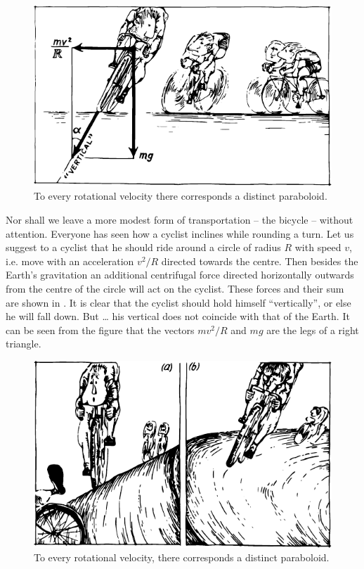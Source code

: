 \begin{figure}[!ht]
\centering
\includegraphics[width=\textwidth]{figures/fig-02-09.pdf}
\caption{To every rotational velocity there corresponds a distinct paraboloid.}
\label{fig-2.09}
\end{figure}

Nor shall we leave a more modest form of transportation -- the bicycle -- without attention. Everyone has seen
how a cyclist inclines while rounding a turn. Let us
suggest to a cyclist that he should ride around a circle
of radius $R$ with speed $v$, i.e. move with an acceleration $v^{2} / R$ directed towards the centre. Then besides the Earth's
gravitation an additional centrifugal force directed
horizontally outwards from the centre of the circle will
act on the cyclist. These forces and their sum are shown
in . It is clear that the cyclist should hold himself ``vertically'', or else he will fall down. But \ldots{} his
vertical does not coincide with that of the Earth. It
can be seen from the figure that the vectors $mv^{2}/R$ and
$mg$ are the legs of a right triangle. 
\begin{figure}[!ht]
\centering
\includegraphics[width=\textwidth]{figures/fig-02-10.pdf}
\caption{To every rotational velocity, there corresponds a distinct paraboloid.}
\label{fig-2.10}
\end{figure}

